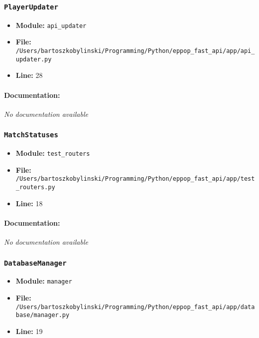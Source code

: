 \documentclass[11pt,a4paper]{article}
\begin{document}
\subsubsection{\texttt{PlayerUpdater}}

\begin{itemize}
    \item \textbf{Module:} \texttt{api\_updater}
    \item \textbf{File:} \texttt{/Users/bartoszkobylinski/Programming/Python/eppop\_fast\_api/app/api\_updater.py}
    \item \textbf{Line:} 28
\end{itemize}

\paragraph{Documentation:} \textit{No documentation available}


\vspace{1em}
\subsubsection{\texttt{MatchStatuses}}

\begin{itemize}
    \item \textbf{Module:} \texttt{test\_routers}
    \item \textbf{File:} \texttt{/Users/bartoszkobylinski/Programming/Python/eppop\_fast\_api/app/test\_routers.py}
    \item \textbf{Line:} 18
\end{itemize}

\paragraph{Documentation:} \textit{No documentation available}


\vspace{1em}
\subsubsection{\texttt{DatabaseManager}}

\begin{itemize}
    \item \textbf{Module:} \texttt{manager}
    \item \textbf{File:} \texttt{/Users/bartoszkobylinski/Programming/Python/eppop\_fast\_api/app/database/manager.py}
    \item \textbf{Line:} 19
\end{itemize}
\end{document}
